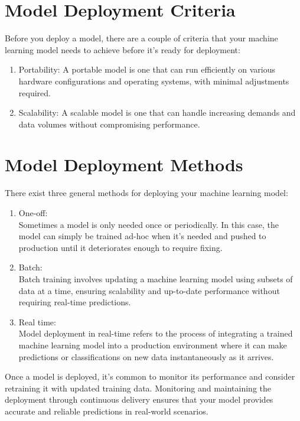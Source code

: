 \documentclass[
]{book}
\providecommand{\tightlist}{%
  \setlength{\itemsep}{0pt}\setlength{\parskip}{0pt}}
\begin{document}
\hypertarget{model-deployment-criteria}{%
\section{Model Deployment Criteria}\label{model-deployment-criteria}}

Before you deploy a model, there are a couple of criteria that your machine learning model needs to achieve before it's ready for deployment:

\begin{enumerate}
\def\labelenumi{\arabic{enumi}.}
\tightlist
\item
  Portability: A portable model is one that can run efficiently on various hardware configurations and operating systems, with minimal adjustments required.
\item
  Scalability: A scalable model is one that can handle increasing demands and data volumes without compromising performance.
\end{enumerate}

\hypertarget{model-deployment-methods}{%
\section{Model Deployment Methods}\label{model-deployment-methods}}

There exist three general methods for deploying your machine learning model:

\begin{enumerate}
\def\labelenumi{\arabic{enumi}.}
\tightlist
\item
  One-off:\\
  Sometimes a model is only needed once or periodically. In this case, the model can simply be trained ad-hoc when it's needed and pushed to production until it deteriorates enough to require fixing.
\item
  Batch:\\
  Batch training involves updating a machine learning model using subsets of data at a time, ensuring scalability and up-to-date performance without requiring real-time predictions.
\item
  Real time:\\
  Model deployment in real-time refers to the process of integrating a trained machine learning model into a production environment where it can make predictions or classifications on new data instantaneously as it arrives.
\end{enumerate}

Once a model is deployed, it's common to monitor its performance and consider retraining it with updated training data. Monitoring and maintaining the deployment through continuous delivery ensures that your model provides accurate and reliable predictions in real-world scenarios.

  
\end{document}
